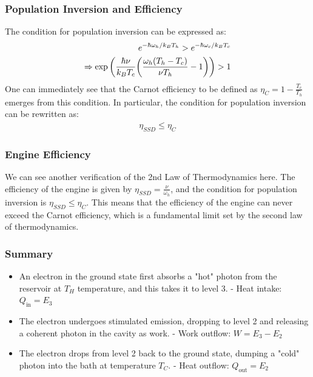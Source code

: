 \documentclass{beamer}
\begin{document}
    \begin{frame}
        \frametitle{Population Inversion and Efficiency}
        \begin{tcolorbox}[colback=red!5!white,colframe=red!75!black,title= Condition for Population Inversion]
            The condition for population inversion can be expressed as:
            \begin{align*}
                e^{-\hbar \omega_h/k_B T_h} > e^{-\hbar \omega_c/k_B T_c} \\  
                \Rightarrow \exp\qty(\frac{\hbar \nu}{k_B T_c} \qty(\frac{\omega_h (T_h - T_c)}{\nu T_h} - 1)) > 1
            \end{align*}
        One can immediately see that the Carnot efficiency to be defined as $\eta_C = 1 - \frac{T_c}{T_h}$ emerges from this condition. In particular, the condition for population inversion can be rewritten as:
        \begin{align*}
            \eta_{SSD} \leq \eta_C
        \end{align*}
        \end{tcolorbox}

    \end{frame}

    \begin{frame}
        \frametitle{Engine Efficiency}
        \begin{tcolorbox}[colback=red!5!white,colframe=red!75!black,title= Second Law of Thermodynamics]
           We can see another verification of the 2nd Law of Thermodynamics here. The efficiency of the engine is given by $\eta_{SSD} = \frac{\nu}{\omega_h}$, and the condition for population inversion is $\eta_{SSD} \leq \eta_C$. This means that the efficiency of the engine can never exceed the Carnot efficiency, which is a fundamental limit set by the second law of thermodynamics.
        \end{tcolorbox}
    \end{frame}
    \begin{frame}
        \frametitle{Summary}
        \begin{itemize}
            
            \item An electron in the ground state first absorbs a "hot" photon from the reservoir at $T_{H}$ temperature, and this takes it to level 3.
                - Heat intake: $Q_{\text{in}} = E_{3}$
            \item  The electron undergoes stimulated emission, dropping to level 2 and releasing a coherent photon in the cavity as work.
                - Work outflow: $W = E_{3}-E_{2}$
            \item The electron drops from level 2 back to the ground state, dumping a "cold" photon into the bath at temperature $T_{C}$.
                - Heat outflow: $Q_{\text{out}}=E_{2}$
        \end{itemize}
    \end{frame}
\end{document}

